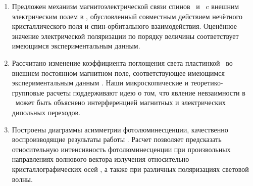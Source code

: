 \begin{enumerate}
  \item Предложен механизм магнитоэлектрической связи спинов \niIon\ и \cu\ c внешним электрическим полем в \ncbo, обусловленный совместным действием нечётного кристаллического поля и спин-орбитального взаимодействия. Оценённое значение электрической поляризации по порядку величины соответствует имеющимся экспериментальным данным. 
  \item Рассчитано изменение коэффициента поглощения света пластинкой \cbo\ во внешнем постоянном магнитном поле, соответствующее имеющимся экспериментальным данным \cite{Toyoda2015}. Наши микроскопические и теоретико-групповые расчеты поддерживают идею о том, что явление невзаимности в \cbo\ может быть объяснено интерференцией магнитных и электрических дипольных переходов.
  \item Построены диаграммы асимметрии фотолюминесценции, качественно воспроизводящие результаты работы \cite{Toyoda2016}. Расчет позволяет предсказать относительную интенсивность фотолюминесценции при произвольных направлениях волнового вектора излучения относительно кристаллографических осей \cbo, а также при различных поляризациях световой волны.

\end{enumerate}
